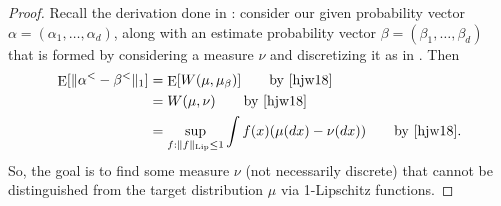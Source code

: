\documentclass{article}
\theoremstyle{definition}
\DeclareMathOperator{\E}{E}
\begin{document}
\begin{proof}
Recall the derivation done in \cite{hjw18}: consider our given probability vector $\alpha = (\alpha_1,\ldots,\alpha_d)$, along with an estimate probability vector $\beta = (\beta_1,\ldots,\beta_d)$ that is formed by considering a measure $\nu$ and discretizing it as in \cite[Definition~8]{hjw18}.
Then
\begin{align*}
    \E[\|\alpha^< - \beta^<\|_1] &= \E[W(\mu, \mu_\beta)] \tag*{by \cite[Lemma~7]{hjw18}} \\
    &= W(\mu, \nu) \tag*{by \cite[Lemma~9]{hjw18}}\\
    &= \sup_{f : \|f\|_{\mathrm{Lip}} \leq 1} \int f(x)(\mu(dx) - \nu(dx)) \tag*{by \cite[Lemma~10]{hjw18}}.
\end{align*}
So, the goal is to find some measure $\nu$ (not necessarily discrete) that cannot be distinguished from the target distribution $\mu$ via 1-Lipschitz functions.


\end{proof}
\end{document}
